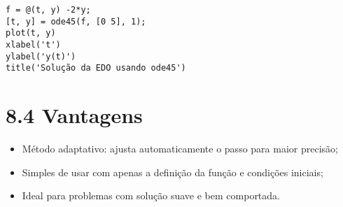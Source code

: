 \begin{verbatim}
f = @(t, y) -2*y;
[t, y] = ode45(f, [0 5], 1);
plot(t, y)
xlabel('t')
ylabel('y(t)')
title('Solução da EDO usando ode45')
\end{verbatim}

\section*{8.4 Vantagens}

\begin{itemize}
    \item Método adaptativo: ajusta automaticamente o passo para maior precisão;
    \item Simples de usar com apenas a definição da função e condições iniciais;
    \item Ideal para problemas com solução suave e bem comportada.
\end{itemize}
